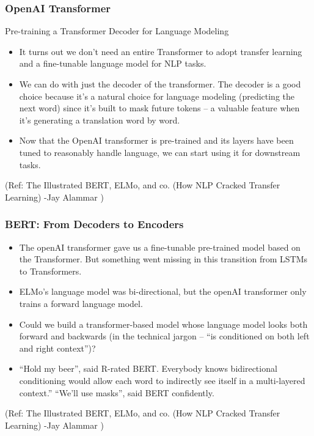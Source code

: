 \begin{frame}[fragile]\frametitle{OpenAI Transformer}
Pre-training a Transformer Decoder for Language Modeling 
\begin{itemize}
\item It turns out we don’t need an entire Transformer to adopt transfer learning and a fine-tunable language model for NLP tasks. 
\item We can do with just the decoder of the transformer. The decoder is a good choice because it’s a natural choice for language modeling (predicting the next word) since it’s built to mask future tokens – a valuable feature when it’s generating a translation word by word.
\item Now that the OpenAI transformer is pre-trained and its layers have been tuned to reasonably handle language, we can start using it for downstream tasks.
\end{itemize}


{\tiny (Ref: The Illustrated BERT, ELMo, and co. (How NLP Cracked Transfer Learning) -Jay Alammar )}
\end{frame}

\begin{frame}[fragile]\frametitle{BERT: From Decoders to Encoders}
\begin{itemize}
\item The openAI transformer gave us a fine-tunable pre-trained model based on the Transformer. But something went missing in this transition from LSTMs to Transformers. 
\item ELMo’s language model was bi-directional, but the openAI transformer only trains a forward language model. 
\item Could we build a transformer-based model whose language model looks both forward and backwards (in the technical jargon – “is conditioned on both left and right context”)?
\item 
“Hold my beer”, said R-rated BERT. Everybody knows bidirectional conditioning would allow each word to indirectly see itself in a multi-layered context.” “We’ll use masks”, said BERT confidently.
\end{itemize}


{\tiny (Ref: The Illustrated BERT, ELMo, and co. (How NLP Cracked Transfer Learning) -Jay Alammar )}
\end{frame}


